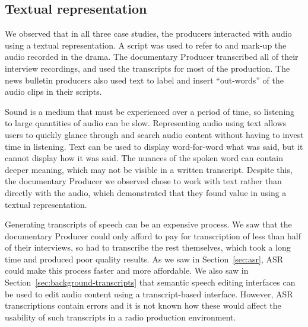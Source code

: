 
\subsection{Textual representation}
We observed that in all three case studies, the producers interacted with audio using a textual representation. A
script was used to refer to and mark-up the audio recorded in the drama. The documentary Producer transcribed all of
their interview recordings, and used the transcripts for most of the production. The news bulletin producers also used
text to label and insert ``out-words'' of the audio clips in their scripts.

Sound is a medium that must be experienced over a period of time, so listening to large quantities of audio can be
slow. Representing audio using text allows users to quickly glance through and search audio content without having to
invest time in listening. Text can be used to display word-for-word what was said, but it cannot display how it was
said. The nuances of the spoken word can contain deeper meaning, which may not be visible in a written
transcript. Despite this, the documentary Producer we observed chose to work with text rather than directly with the
audio, which demonstrated that they found value in using a textual representation.

Generating transcripts of speech can be an expensive process. We saw that the documentary Producer could only afford to
pay for transcription of less than half of their interviews, so had to transcribe the rest themselves, which took a
long time and produced poor quality results.  As we saw in Section~\ref{sec:asr}, ASR
could make this process faster and more affordable. We also saw in Section~\ref{sec:background-transcripts} that
semantic speech editing interfaces can be used to edit audio content using a transcript-based interface. However, ASR
transcriptions contain errors and it is not known how these would affect the usability of such transcripts in a radio
production environment.

